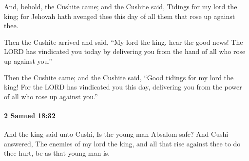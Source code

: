 			\begin{versebox}
					\item[BHS] 
					\item[ASV] And, behold, the Cushite came; and the Cushite said, Tidings for my lord the king; for Jehovah hath avenged thee this day of all them that rose up against thee.
					\item[NIV] Then the Cushite arrived and said, “My lord the king, hear the good news! The LORD has vindicated you today by delivering you from the hand of all who rose up against you.”
					\item[NRSV] Then the Cushite came; and the Cushite said, “Good tidings for my lord the king! For the LORD has vindicated you this day, delivering you from the power of all who rose up against you.”
			\end{versebox}

		\paragraph{2 Samuel 18:32} %
			\label{2SAMUEL-18-32}

			And the king said unto Cushi, Is the young man Absalom safe? And Cushi answered, The enemies of my lord the king, and all that rise against thee to do thee hurt, be as that young man is.

